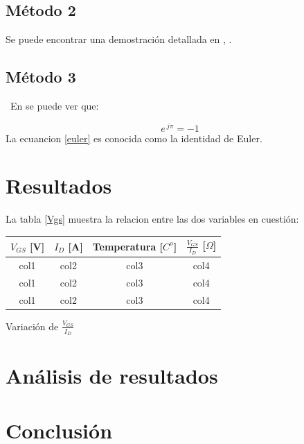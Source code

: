 \documentclass[]{article}
\makeatletter
\newenvironment{tablehere}    %
  {\def\@captype{table}}    %

  {}              %
\makeatother
\begin{document}
\begin{multicols}{2}
\subsection{Método 2} %
\lipsum[7]
Se puede encontrar una demostración detallada en \cite{Sh:575} , \cite{Sh:572}.
\subsection{Método 3} %
\
\lipsum[8] En \cite{webster} se puede ver que:

\begin{equation}
 e^{ \ j  \pi} = -1
 \label{euler}
\end{equation}
La ecuancion \ref{euler} es conocida como la identidad de Euler.

\section{Resultados}

La tabla \ref{Vgs} muestra la relacion entre las dos variables en cuestión:

\begin{tablehere}
\begin{center}
\begin{tabular}{|c|c|c|c|}
\hline
$V_{GS}$ [V] & $I_{D}$ [A] & Temperatura [$C^{o}$] & $\frac{V_{GS}}{I_D}$ [$\Omega$] \\
\hline
col1 & col2 & col3 & col4 \\

col1 & col2 & col3 & col4 \\

col1 & col2 & col3 & col4 \\
\hline
\end{tabular}
\caption{Variación de $\frac{V_{GS}}{I_D}$}
\label{Vgs}
\end{center}
\end{tablehere}

\lipsum[1]


\section{Análisis de resultados}
\lipsum[1]
\section{Conclusión}
\lipsum[1]

\printbibliography
\end{multicols}
\end{document}
